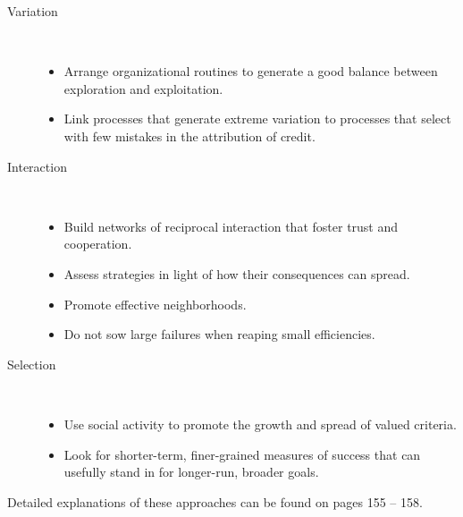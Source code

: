 \documentclass[letterpaper,10pt]{article}
\begin{document}
\begin{description}
\begin{description}
  \item[Variation] \ \\
    \begin{itemize}
      \item Arrange organizational routines to generate a good balance between exploration and exploitation.
      \item Link processes that generate extreme variation to processes that select with few mistakes in the attribution of credit.
    \end{itemize}
  \item[Interaction] \ \\
    \begin{itemize}
      \item Build networks of reciprocal interaction that foster trust and cooperation.
      \item Assess strategies in light of how their consequences can spread.
      \item Promote effective neighborhoods.
      \item Do not sow large failures when reaping small efficiencies.
    \end{itemize}
  \item[Selection] \ \\
    \begin{itemize}
      \item Use social activity to promote the growth and spread of valued criteria.
      \item Look for shorter-term, finer-grained measures of success that can usefully stand in for longer-run, broader goals.
    \end{itemize}
\end{description}

Detailed explanations of these approaches can be found on pages 155 -- 158.

\end{description}
\end{document}

